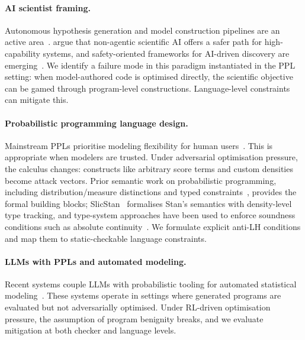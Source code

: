 \documentclass[preprint]{uai2026} %
\begin{document}
\paragraph{AI scientist framing.}
Autonomous hypothesis generation and model construction pipelines are an active area~\citep{luAIScientistFully2024,yamadaAIScientistv2WorkshopLevel2025}. \citet{bengioSuperintelligentAgentsPose2025} argue that non-agentic scientific AI offers a safer path for high-capability systems, and safety-oriented frameworks for AI-driven discovery are emerging~\citep{zhuSafeScientistEnhancingAI2025,tangRisksAIScientists2025}. We identify a failure mode in this paradigm instantiated in the PPL setting: when model-authored code is optimised directly, the scientific objective can be gamed through program-level constructions. Language-level constraints can mitigate this.

\paragraph{Probabilistic programming language design.}
Mainstream PPLs prioritise modeling flexibility for human users~\citep{standevelopmentteamStanReferenceManual2025,bingham2019pyro,Abril-Pla_PyMC_a_modern_2023}. This is appropriate when modelers are trusted. Under adversarial optimisation pressure, the calculus changes: constructs like arbitrary score terms and custom densities become attack vectors. Prior semantic work on probabilistic programming, including distribution/measure distinctions and typed constraints~\citep{dashAffineMonadsLazy2023}, provides the formal building blocks; SlicStan~\citep{gorinovaProbabilisticProgrammingDensities2019} formalises Stan's semantics with density-level type tracking, and type-system approaches have been used to enforce soundness conditions such as absolute continuity~\citep{wangSoundProbabilisticInference2021}. We formulate explicit anti-LH conditions and map them to static-checkable language constraints.

\paragraph{LLMs with PPLs and automated modeling.}
Recent systems couple LLMs with probabilistic tooling for automated statistical modeling~\citep{liAutomatedStatisticalModel2024,gandhiBoxingGymBenchmarkingProgress2025,domkeLargeLanguageBayes2025,choudhuryBEDLLMIntelligentInformation2025,wahlProbabilisticFrameworkLLM2026}. These systems operate in settings where generated programs are evaluated but not adversarially optimised. Under RL-driven optimisation pressure, the assumption of program benignity breaks, and we evaluate mitigation at both checker and language levels.
\end{document}
